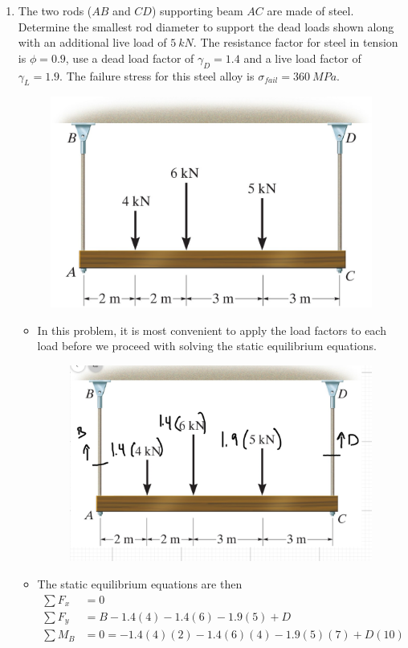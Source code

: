 \documentclass[12pt, oneside]{article}
\begin{document}
\begin{enumerate}
	\item %
		The two rods ($AB$ and $CD$) supporting beam $AC$ are made of steel.
		Determine the smallest rod diameter to support the dead loads shown along with an additional live load of $\SI{5}{kN}$.
		The resistance factor for steel in tension is $\phi=0.9$, use a dead load factor of $\gamma_D = 1.4$ and a live load factor of $\gamma_L = 1.9$.
		The failure stress for this steel alloy is $\sigma_{fail} = \SI{360}{MPa}$.
		\begin{figure}[H]
			\centering
			\includegraphics[width=0.6\linewidth]{hangingbeam}
			\label{fig:hangingbeam}
		\end{figure}
		\begin{itemize}
			\item In this problem, it is most convenient to apply the load factors to each load before we proceed with solving the static equilibrium equations.
			\begin{figure}[H]
				\centering
				\includegraphics[width=0.7\linewidth]{hw1-7}
			\end{figure}
		\item The static equilibrium equations are then
		\begin{align*}
			\sum F_x &= 0\\
			\sum F_y &= B - 1.4(4) - 1.4(6) - 1.9(5) + D\\
			\sum M_B &= 0 = -1.4(4)(2) - 1.4(6)(4) - 1.9(5)(7) + D(10)\\

\end{align*}
\end{itemize}
\end{enumerate}
\end{document}
